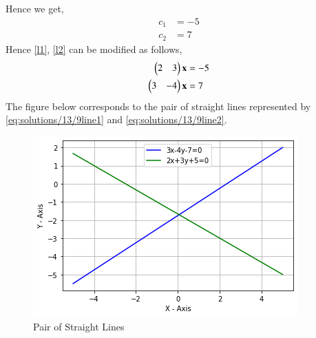 Hence we get,
\begin{align}
    c_1&=-5\\
    c_2&=7
\end{align}
Hence \eqref{l1}, \eqref{l2} can be modified as follows,
\begin{align}
    \begin{pmatrix}2 & 3\end{pmatrix}\mathbf{x}&=-5\label{eq:solutions/13/9line1}\\
    \begin{pmatrix}3 & -4\end{pmatrix}\mathbf{x}&=7\label{eq:solutions/13/9line2}
\end{align}
The figure below corresponds to the pair of straight lines represented by \eqref{eq:solutions/13/9line1} and \eqref{eq:solutions/13/9line2}.
\begin{figure}[h!]
\centering
\includegraphics[width = \columnwidth]{./solutions/13/9/Lines.png}
\caption{Pair of Straight Lines}
\label{fig:solutions/13/9my_label}
\end{figure}
